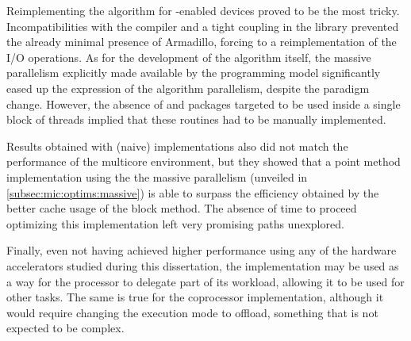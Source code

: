 \documentclass[../thesis]{subfiles}
\begin{document}
	Reimplementing the algorithm for \cuda-enabled devices proved to be the most tricky. Incompatibilities with the compiler and a tight coupling in the library prevented the already minimal presence of Armadillo, forcing to a reimplementation of the I/O operations. As for the development of the algorithm itself, the massive parallelism explicitly made available by the \cuda programming model significantly eased up the expression of the algorithm parallelism, despite the paradigm change. However, the absence of \blas and \lapack packages targeted to be used inside a single block of threads implied that these routines had to be manually implemented.

	Results obtained with (naive) \cuda implementations also did not match the performance of the multicore environment, but they showed that a point method implementation using the the massive parallelism (unveiled in \cref{subsec:mic:optims:massive}) is able to surpass the efficiency obtained by the better cache usage of the block method. The absence of time to proceed optimizing this implementation left very promising paths unexplored.

	Finally, even not having achieved higher performance using any of the hardware accelerators studied during this dissertation, the \cuda implementation may be used as a way for the processor to delegate part of its workload, allowing it to be used for other tasks. The same is true for the coprocessor implementation, although it would require changing the execution mode to offload, something that is not expected to be complex.

	
\end{document}

